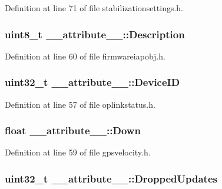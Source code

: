 \-Definition at line 71 of file stabilizationsettings.\-h.

\hypertarget{struct____attribute_____ac86e7615537064e90f754644d6f1e796}{
\subsubsection[{\-Description}]{\setlength{\rightskip}{0pt plus 5cm}uint8\-\_\-t {\bf \-\_\-\-\_\-attribute\-\_\-\-\_\-\-::\-Description}}}\label{struct____attribute_____ac86e7615537064e90f754644d6f1e796}


\-Definition at line 60 of file firmwareiapobj.\-h.

\hypertarget{struct____attribute_____a03ce6905ffece1c1579deb4364e1e935}{
\subsubsection[{\-Device\-I\-D}]{\setlength{\rightskip}{0pt plus 5cm}uint32\-\_\-t {\bf \-\_\-\-\_\-attribute\-\_\-\-\_\-\-::\-Device\-I\-D}}}\label{struct____attribute_____a03ce6905ffece1c1579deb4364e1e935}


\-Definition at line 57 of file oplinkstatus.\-h.

\hypertarget{struct____attribute_____a7494f86dc4a5484037486740cc098800}{
\subsubsection[{\-Down}]{\setlength{\rightskip}{0pt plus 5cm}float {\bf \-\_\-\-\_\-attribute\-\_\-\-\_\-\-::\-Down}}}\label{struct____attribute_____a7494f86dc4a5484037486740cc098800}


\-Definition at line 59 of file gpsvelocity.\-h.

\hypertarget{struct____attribute_____af09a2db72ac61b1f5a412e4aab4911b4}{
\subsubsection[{\-Dropped\-Updates}]{\setlength{\rightskip}{0pt plus 5cm}uint32\-\_\-t {\bf \-\_\-\-\_\-attribute\-\_\-\-\_\-\-::\-Dropped\-Updates}}}\label{struct____attribute_____af09a2db72ac61b1f5a412e4aab4911b4}


